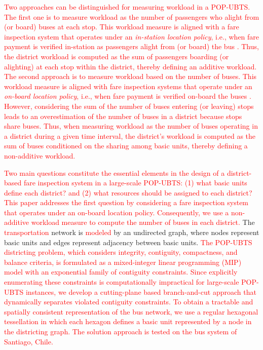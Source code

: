 \documentclass[preprint,11pt]{elsarticle}
\begin{document}
\textcolor{red}{Two approaches can be distinguished for measuring workload in a POP-UBTS. 
The first one is to measure workload as the number of passengers who alight from (or board) buses at each stop. 
This workload measure is aligned with a fare inspection system that operates under an \textit{in-station location policy}, i.e., when fare payment is verified in-station as passengers alight from (or board) the bus \citep{Escalona2024}. 
Thus, the district workload is computed as the sum of passengers boarding (or alighting) at each stop within the district, thereby defining an additive workload. 
The second approach is to measure workload based on the number of buses. This workload measure is aligned with fare inspection systems that operate under an \textit{on-board location policy}, i.e., when fare payment is verified on-board the buses \citep{Escalona2024,barabino2025comparing}. 
However, considering the sum of the number of buses entering (or leaving) stops leads to an overestimation of the number of buses in a  district because stops share buses. 
Thus, when measuring workload as the number of buses operating in a district during a given time interval, the district’s workload is computed as the sum of buses conditioned on the sharing among basic units, thereby defining a non-additive workload.}

\textcolor{red}{Two main questions constitute the essential elements in the design of a district-based fare inspection system in a large-scale POP-UBTS: 
(1) what basic units define each district? and 
(2) what resources should be assigned to each district? 
This paper addresses the first question by considering a fare inspection system that operates under an on-board location policy. 
Consequently, we use a non-additive workload measure to compute the number of buses in each district.}
The \textcolor{red}{transportation} network is \textcolor{red}{modeled} by an undirected graph, where nodes represent basic units and edges represent adjacency between basic units.
\textcolor{red}{
The POP-UBTS districting problem, which considers integrity, contiguity, compactness, and balance criteria, is formulated as a mixed-integer linear programming (MIP) model with an exponential family of contiguity constraints. 
Since explicitly enumerating these constraints is computationally impractical for large-scale POP-UBTS instances, we develop a cutting-plane based branch-and-cut approach that dynamically separates violated contiguity constraints. 
To obtain a tractable and spatially consistent representation of the bus network, we use a regular hexagonal tessellation in which each hexagon defines a basic unit represented by a node in the districting graph.
}
\textcolor{red}{The solution approach is tested on the bus system of Santiago, Chile.} 
\end{document}
